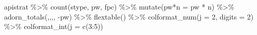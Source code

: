 \documentclass[
]{book}
\newenvironment{Shaded}{\begin{snugshade}}{\end{snugshade}}
\newcommand{\AttributeTok}[1]{\textcolor[rgb]{0.77,0.63,0.00}{#1}}
\newcommand{\DecValTok}[1]{\textcolor[rgb]{0.00,0.00,0.81}{#1}}
\newcommand{\FunctionTok}[1]{\textcolor[rgb]{0.00,0.00,0.00}{#1}}
\newcommand{\NormalTok}[1]{#1}
\newcommand{\OtherTok}[1]{\textcolor[rgb]{0.56,0.35,0.01}{#1}}
\newcommand{\SpecialCharTok}[1]{\textcolor[rgb]{0.00,0.00,0.00}{#1}}
\newcommand{\StringTok}[1]{\textcolor[rgb]{0.31,0.60,0.02}{#1}}
\theoremstyle{definition}
\theoremstyle{definition}
\theoremstyle{definition}
\theoremstyle{definition}
\theoremstyle{remark}
\begin{document}
\begin{Shaded}
\begin{Highlighting}[]
\NormalTok{apistrat }\SpecialCharTok{\%\textgreater{}\%} 
  \FunctionTok{count}\NormalTok{(stype, pw, fpc) }\SpecialCharTok{\%\textgreater{}\%} 
  \FunctionTok{mutate}\NormalTok{(}\StringTok{\textasciigrave{}}\AttributeTok{pw*n}\StringTok{\textasciigrave{}} \OtherTok{=}\NormalTok{ pw }\SpecialCharTok{*}\NormalTok{ n) }\SpecialCharTok{\%\textgreater{}\%}
  \FunctionTok{adorn\_totals}\NormalTok{(,,,, }\SpecialCharTok{{-}}\NormalTok{pw) }\SpecialCharTok{\%\textgreater{}\%} 
  \FunctionTok{flextable}\NormalTok{() }\SpecialCharTok{\%\textgreater{}\%} \FunctionTok{colformat\_num}\NormalTok{(}\AttributeTok{j =} \DecValTok{2}\NormalTok{, }\AttributeTok{digits =} \DecValTok{2}\NormalTok{) }\SpecialCharTok{\%\textgreater{}\%} \FunctionTok{colformat\_int}\NormalTok{(}\AttributeTok{j =} \FunctionTok{c}\NormalTok{(}\DecValTok{3}\SpecialCharTok{:}\DecValTok{5}\NormalTok{))}
\end{Highlighting}
\end{Shaded}

\providecommand{\docline}[3]{\noalign{\global\setlength{\arrayrulewidth}{#1}}\arrayrulecolor[HTML]{#2}\cline{#3}}

\setlength{\tabcolsep}{0pt}

\renewcommand*{\arraystretch}{1.5}
\end{document}
